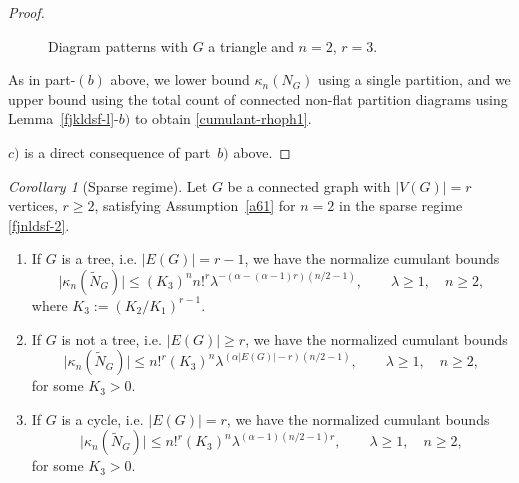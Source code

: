 \documentclass[bj,authoryear,noshowframe]{imsart}
\theoremstyle{plain}
\theoremstyle{remark}
\newtheorem{corollary}[prop]{Corollary}
\begin{document}
\begin{proof}
\begin{figure}[H]
{{\begin{tikzpicture}
 \end{tikzpicture}}
   }
   \caption{Diagram patterns with $G$ a triangle and $n=2$, $r=3$.}
 \label{fig:diagram3-23}
 \end{figure}
 
 \vspace{-1cm}
 
 \noindent
  As in part-$(b)$ above, we lower
  bound $\kappa_n(N_G)$ using a single partition,
  and we upper bound using the total count of
  connected non-flat partition diagrams using Lemma~\ref{fjkldsf-l}-$b)$
  to obtain \eqref{cumulant-rhoph1}.
  
 \noindent
    $c)$ is a direct consequence of part~$b)$ above.
 \end{proof}
 
 \begin{corollary}[Sparse regime] 
 \label{th6.4-c}
   Let $G$ be a connected graph with $|V(G)|=r$ vertices, $r\geq 2$,
   satisfying Assumption~\ref{a61} for $n=2$ in the sparse regime \eqref{fjnldsf-2}. 
   \begin{enumerate} %
   \item 
     If $G$ is a tree, i.e. $|E(G)| = r-1$, we have the normalize
     cumulant bounds %
  \begin{equation}
    \label{jfkla} 
    \big|\kappa_n(\widetilde{N}_G)\big|
   \leq 
    (K_3)^n 
  n!^r
       \lambda^{
        - (
 \alpha       -(\alpha - 1)r 
        ) ( n/2-1 ) },
    \qquad \lambda \geq 1,
    \quad n \geq 2, 
 \end{equation} 
  where $K_3:=(K_2/K_1)^{r-1}$.
 \item
  If $G$ is not a tree, i.e. $|E(G)|\geq r$,
  we have the normalized cumulant bounds %
  \begin{equation}
    \label{fjklds34} 
     \big|\kappa_n(\widetilde{N}_G)\big|
   \leq 
     n!^r
     (K_3)^n
         \lambda^{(\alpha |E(G)|-r)(n/2-1)}  , 
    \qquad \lambda \geq 1,
   \quad n \geq 2, 
 \end{equation} 
  for some $K_3 > 0$. 
 \item
   If $G$ is a cycle, i.e. $|E(G)| = r$,
   we have the normalized cumulant bounds %
  \begin{equation}
    \label{fjklds34-2} 
     \big|\kappa_n(\widetilde{N}_G)\big|
   \leq 
   n!^r
   (K_3)^n
     \lambda^{ (\alpha -1 )(n/2-1)r}, 
      \qquad \lambda \geq 1,
  \quad n \geq 2, 
 \end{equation} 
  for some $K_3>0$.
   \end{enumerate}
 \end{corollary}
\end{document}
